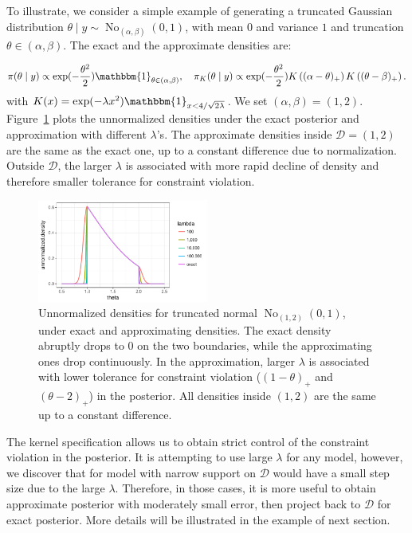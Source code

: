 \documentclass[10pt]{article}
\newcommand{\mc}[1]{\mathcal{#1}}
\DeclareMathOperator{\No}{No}
\begin{document}
To illustrate, we consider a simple example of generating a truncated Gaussian distribution $\theta \mid y \sim \No_{(\alpha,\beta)}(0,1)$, with mean $0$ and variance $1$ and truncation $\theta\in (\alpha,\beta)$. The exact and the approximate densities are:

$$\pi(\theta\mid y)\propto \exp(-\frac{\theta^2}{2}) \mathbbm{1}_{\theta\in(\alpha,\beta)}, \quad \pi_K(\theta\mid y)\propto \exp(-\frac{\theta^2}{2}) K \left ( (\alpha - \theta)_+ \right) K \left ( ( \theta - \beta)_+ \right).$$
with $K(x)= \exp( - \lambda x^2)\mathbbm{1}_{x<4/\sqrt{2\lambda}}$. We set $(\alpha, \beta)=(1,2)$. Figure~\ref{truncated_normal} plots the unnormalized densities under the exact posterior and approximation with different $\lambda$'s. The approximate densities inside $\mc D = (1,2)$ are the same as the exact one, up to a constant difference due to normalization. Outside $\mc D$, the larger $\lambda$ is associated with more rapid decline of density and therefore smaller tolerance for constraint violation.

\begin{figure}[H]
 \centering
 \includegraphics[width=0.5\textwidth]{density_truncated_normal}
\caption{Unnormalized densities for truncated normal $\No_{(1,2)}(0,1)$, under exact and approximating densities. The exact density abruptly drops to $0$ on the two boundaries, while the approximating ones drop continuously. In the approximation, larger $\lambda$ is associated with lower tolerance for constraint violation ($( 1-\theta )_+$ and $( \theta - 2)_+$) in the posterior. All densities inside $(1,2)$ are the same up to a constant difference.}
\label{truncated_normal}
\end{figure}

The kernel specification allows us to obtain strict control of the constraint violation in the posterior. It is attempting to use large $\lambda$ for any model, however, we discover that for model with narrow support on $\mc D$ would have a small step size due to the large $\lambda$. Therefore, in those cases, it is more useful to obtain approximate posterior with moderately small error, then project back to $\mc D$ for exact posterior. More details will be illustrated in the example of next section.
\end{document}
